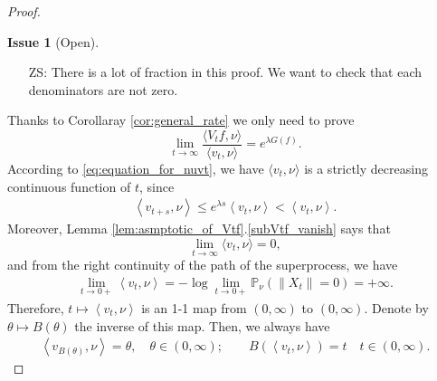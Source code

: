 \documentclass[12pt,a4paper]{amsart}
\numberwithin{equation}{section}
\theoremstyle{plain}
\theoremstyle{definition}
\newtheorem{iss}{Issue}
\begin{document}
\begin{proof}
  \begin{iss}[Open]~
    \begin{itemize}
    \item[ZS:]
There is a lot of fraction in this proof.
We want to check that each denominators are not zero.
    \end{itemize}
  \end{iss}
	Thanks to Corollaray \ref{cor:general_rate} we only need to prove
  \begin{equation}\label{eq:spec_ratio}
    \lim_{t\rightarrow\infty}\frac{\langle V_tf,\nu\rangle }{\langle v_t,\nu\rangle }=e^{\lambda G(f)}.
  \end{equation}
  According to \eqref{eq:equation_for_nuvt}, we have $\langle v_t,\nu\rangle$ is a strictly decreasing continuous function of $t$, since
  \begin{align}\label{eq:monotone}
    \left\langle v_{t+s},\nu \right\rangle 
\leq e^{\lambda s} \left\langle v_{t},\nu \right\rangle
< \left\langle v_t,\nu \right\rangle.  
\end{align}
Moreover, Lemma \ref{lem:asmptotic_of_Vtf}.\eqref{subVtf_vanish} says that
  \[
\lim_{t\rightarrow\infty}\langle v_t,\nu\rangle =0,
  \]
and from the right continuity of the path of the superprocess, we have
\begin{align}
  \lim_{t\to 0+} \left\langle v_t,\nu \right\rangle 
  = - \log \lim_{t\to 0+} \mathbb P_\nu\left( \|X_t\| = 0 \right)
= +\infty.
\end{align}
Therefore, $t \mapsto \left\langle v_t,\nu \right\rangle$ is an 1-1 map from $(0,\infty)$ to $(0,\infty)$. 
Denote by $\theta \mapsto B(\theta)$ the inverse of this map.
Then, we always have
\begin{align}
  \left\langle v_{B(\theta)},\nu \right\rangle 
  = \theta,
\quad \theta \in (0,\infty);
\qquad 
  B\left( \left\langle v_t,\nu \right\rangle \right) 
= t
\quad t\in (0,\infty).
\end{align}


\end{proof}
\end{document}
